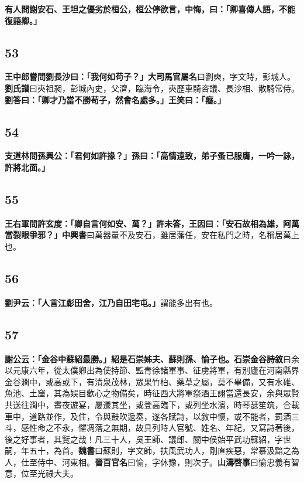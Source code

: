 \textbf{有人問謝安石、王坦之優劣於桓公，桓公停欲言，中悔，曰：「卿喜傳人語，不能復語卿。」}

\subsection*{53}

\textbf{王中郎嘗問劉長沙曰：「我何如苟子？」}{\footnotesize \textbf{大司馬官屬名}曰劉奭，字文時，彭城人。\textbf{劉氏譜}曰奭祖昶，彭城內史，父濟，臨海令，奭歷車騎咨議、長沙相、散騎常侍。}\textbf{劉答曰：「卿才乃當不勝苟子，然會名處多。」王笑曰：「癡。」}

\subsection*{54}

\textbf{支道林問孫興公：「君何如許掾？」孫曰：「高情遠致，弟子蚤已服膺，一吟一詠，許將北面。」}

\subsection*{55}

\textbf{王右軍問許玄度：「卿自言何如安、萬？」許未答，王因曰：「安石故相為雄，阿萬當裂眼爭邪？」}{\footnotesize \textbf{中興書}曰萬器量不及安石，雖居藩任，安在私門之時，名稱居萬上也。}

\subsection*{56}

\textbf{劉尹云：「人言江虨田舍，江乃自田宅屯。」}{\footnotesize 謂能多出有也。}

\subsection*{57}

\textbf{謝公云：「金谷中蘇紹最勝。」紹是石崇姊夫、蘇則孫、愉子也。}{\footnotesize \textbf{石崇金谷詩敘}曰余以元康六年，從太僕卿出為使持節、監青徐諸軍事、征虜將軍，有別廬在河南縣界金谷澗中，或高或下，有清泉茂林，眾果竹柏、藥草之屬，莫不畢備，又有水碓、魚池、土窟，其為娛目歡心之物備矣，時征西大將軍祭酒王詡當還長安，余與眾賢共送往澗中，晝夜遊宴，屢遷其坐，或登高臨下，或列坐水濱，時琴瑟笙筑，合載車中，道路並作，及住，令與鼓吹遞奏，遂各賦詩，以敘中懷，或不能者，罰酒三斗，感性命之不永，懼凋落之無期，故具列時人官號、姓名、年紀，又寫詩著後，後之好事者，其覽之哉！凡三十人，吳王師、議郎、關中侯始平武功蘇紹，字世嗣，年五十，為首。\textbf{魏書}曰蘇則，字文師，扶風武功人，剛直疾惡，常慕汲黯之為人，仕至侍中、河東相。\textbf{晉百官名}曰愉，字休豫，則次子。\textbf{山濤啓事}曰愉忠義有智意，位至光祿大夫。}

